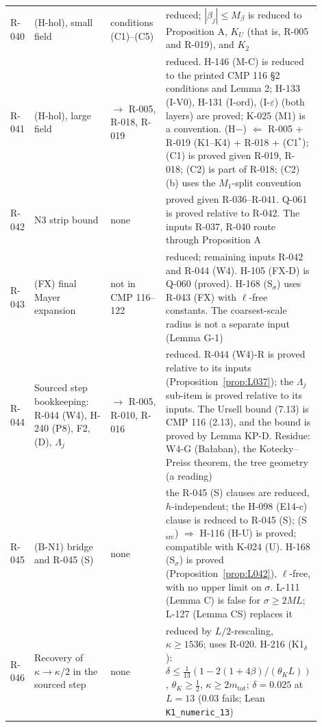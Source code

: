 {\begin{longtable}{p{0.05\linewidth}p{0.33\linewidth}p{0.2\linewidth}p{0.32\linewidth}}
R-040 & (H-hol), small field & conditions (C1)--(C5) & reduced; $|\beta_j|\le M_\beta$ is reduced to Proposition A, $K_U$ (that is, R-005 and R-019), and $K_2$ \\
R-041 & (H-hol), large field & $\to$ R-005, R-018, R-019 & reduced. H-146 (M-C) is reduced to the printed CMP 116 \S2 conditions and Lemma 2; H-133 (I-V0), H-131 (I-ord), (I-$\varepsilon$) (both layers) are proved; K-025 (M1) is a convention. (H$-$) $\Leftarrow$ R-005 + R-019 (K1--K4) + R-018 + (C1$^*$); (C1) is proved given R-019, R-018; (C2) is part of R-018; (C2)(b) uses the $M_1$-split convention \\
R-042 & N3 strip bound & none & proved given R-036--R-041. Q-061 is proved relative to R-042. The inputs R-037, R-040 route through Proposition A \\
R-043 & (FX) final Mayer expansion & not in CMP 116--122 & reduced; remaining inputs R-042 and R-044 (W4). H-105 (FX-D) is Q-060 (proved). H-168 (S$_\sigma$) uses R-043 (FX) with $\ell$-free constants. The coarsest-scale radius is not a separate input (Lemma G-1) \\
R-044 & Sourced step bookkeeping: R-044 (W4), H-240 (P8), F2, (D), $\Lambda_j$ & $\to$ R-005, R-010, R-016 & reduced. R-044 (W4)-R is proved relative to its inputs (Proposition~\ref{prop:L037}); the $\Lambda_j$ sub-item is proved relative to its inputs. The Ursell bound (7.13) is CMP 116 (2.13), and the bound is proved by Lemma KP-D. Residue: W4-G (Ba{\l}aban), the Kotecky--Preiss theorem, the tree geometry (a reading) \\
R-045 & (B-N1) bridge and R-045 (S) & none & the R-045 (S) clauses are reduced, $h$-independent; the H-098 (E14-c) clause is reduced to R-045 (S); (S$_{\mathrm{src}}$) $\Rightarrow$ H-116 (H-U) is proved; compatible with K-024 (U). H-168 (S$_\sigma$) is proved (Proposition~\ref{prop:L042}), $\ell$-free, with no upper limit on $\sigma$. L-111 (Lemma C) is false for $\sigma\ge2ML$; L-127 (Lemma CS) replaces it \\
R-046 & Recovery of $\kappa\to\kappa/2$ in the sourced step & none & reduced by $L/2$-rescaling, $\kappa\ge1536$; uses R-020. H-216 (K1$_\delta$): $\delta\le\tfrac1{13}(1-2(1+4\beta)/(\theta_KL))$, $\theta_K\ge\tfrac12$, $\kappa\ge2m_{\mathrm{tot}}$; $\delta=0.025$ at $L=13$ ($0.03$ fails; Lean \texttt{K1\_numeric\_13}) \\ \hline
\end{longtable}

}

